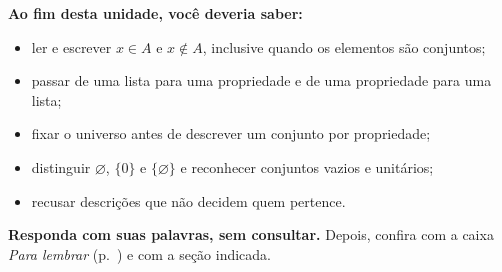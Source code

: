 \begin{sintese}
\textbf{Ao fim desta unidade, você deveria saber:}
\begin{itemize}[leftmargin=1.4em,itemsep=1pt]
  \item ler e escrever $x\in A$ e $x\notin A$, inclusive quando os elementos são conjuntos;
  \item passar de uma lista para uma propriedade e de uma propriedade para uma lista;
  \item fixar o universo antes de descrever um conjunto por propriedade;
  \item distinguir $\varnothing$, $\{0\}$ e $\{\varnothing\}$ e reconhecer conjuntos vazios e unitários;
  \item recusar descrições que não decidem quem pertence.
\end{itemize}
\smallskip\noindent\textbf{Responda com suas palavras, sem consultar.} Depois, confira com a caixa \emph{Para lembrar} (p.~\pageref{lembrar-u1}) e com a seção indicada.
\begin{enumerate}[label=\arabic*.,leftmargin=1.4em]
\end{enumerate}
\end{sintese}

\Respostas
{\small{}}
